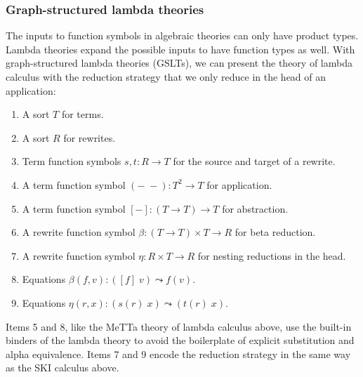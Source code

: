 \documentclass{article}
\begin{document}
\subsubsection{Graph-structured lambda theories}

The inputs to function symbols in algebraic theories can only have product types.  Lambda theories expand the possible inputs to have function types as well.  With graph-structured lambda theories (GSLTs), we can present the theory of lambda calculus with the reduction strategy that we only reduce in the head of an application:
\begin{enumerate}
    \item A sort $T$ for terms.
    \item A sort $R$ for rewrites.
    \item Term function symbols $s, t\colon R \to T$ for the source and target of a rewrite.
    \item A term function symbol $(-\; -)\colon T^2 \to T$ for application.
    \item A term function symbol $[-]\colon (T \to T) \to T$ for abstraction.
    \item A rewrite function symbol $\beta\colon (T \to T) \times T \to R$ for beta reduction.
    \item A rewrite function symbol $\eta\colon R \times T \to R$ for nesting reductions in the head.
    \item Equations $\beta(f, v)\colon ([f]\; v) \leadsto f(v).$
    \item Equations $\eta(r, x)\colon (s(r)\; x) \leadsto (t(r)\; x).$
\end{enumerate}
Items 5 and 8, like the MeTTa theory of lambda calculus above, use the built-in binders of the lambda theory to avoid the boilerplate of explicit substitution and alpha equivalence.  Items 7 and 9 encode the reduction strategy in the same way as the SKI calculus above.
\end{document}
